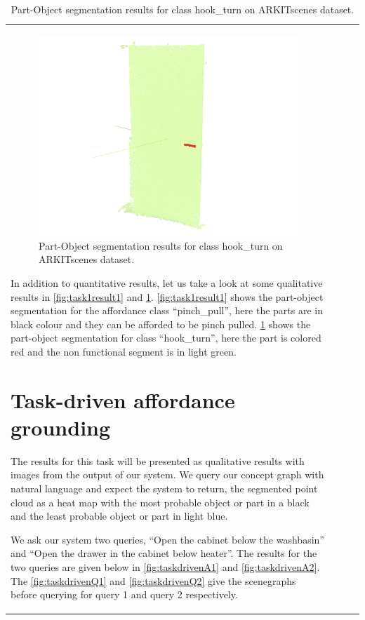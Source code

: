 \begin{longtable}{l|l|l|l}
\begin{figure}[ht!]
    \centering
    \includegraphics[width=\textwidth]{content/images/results/PartObj2.png}
    \caption{Part-Object segmentation results for class hook\_turn on ARKITscenes dataset.}
    \label{fig:task1result2}
\end{figure}
In addition to quantitative results, let us take a look at some qualitative results in \cref{fig:task1result1} and \cref{fig:task1result2}. 
\cref{fig:task1result1} shows the part-object segmentation for the affordance class \enquote{pinch\_pull}, here the parts are in black colour and
they can be afforded to be pinch pulled. \cref{fig:task1result2} shows the part-object segmentation for class \enquote{hook\_turn}, here
the part is colored red and the non functional segment is in light green.

\section{Task-driven affordance grounding}
\label{sec:TDAG}
The results for this task will be presented as qualitative results with images from the output of our system. We query our concept graph with natural language
 and expect the system to return, the segmented point cloud as a heat map with the most probable object or part in a black and 
 the least probable object or part in light blue. 

We ask our system two queries, \enquote{Open the cabinet below the washbasin} and \enquote{Open the drawer in the cabinet below heater}. 
The results for the two queries are given below in \cref{fig:taskdrivenA1} and \cref{fig:taskdrivenA2}. The \cref{fig:taskdrivenQ1} and \cref{fig:taskdrivenQ2} 
give the scenegraphs before querying for query 1 and query 2 respectively.


\end{longtable}
